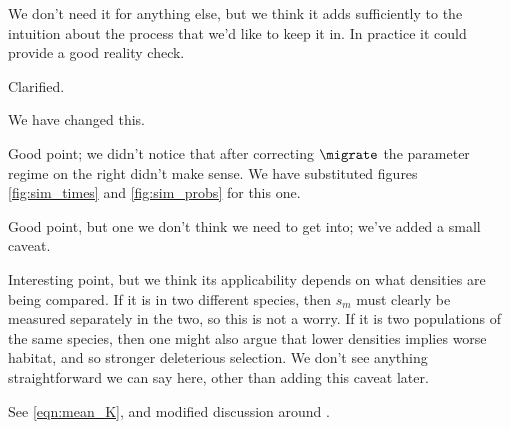 
\reply
We don't need it for anything else, 
but we think it adds sufficiently to the intuition about the process
that we'd like to keep it in.
In practice it could provide a good reality check.


\reply
Clarified. 


\reply
We have changed this. 



\reply
Good point; we didn't notice that after correcting $\migrate$ the parameter regime on the right didn't make sense.
We have substituted figures \ref{fig:sim_times} and \ref{fig:sim_probs} for this one.

\point{[\eqref{eqn:total_migrate} assumes no interference}{ 
}

\reply
Good point, but one we don't think we need to get into; we've added a small caveat.



\reply
Interesting point,
but we think its applicability depends on what densities are being compared.
If it is in two different species, then $s_m$ must clearly be measured separately in the two,
so this is not a worry.
If it is two populations of the same species,
then one might also argue that lower densities implies worse habitat,
and so stronger deleterious selection.
We don't see anything straightforward we can say here, 
other than adding this caveat later. 


\reply
See \eqref{eqn:mean_K}, and modified discussion around .

